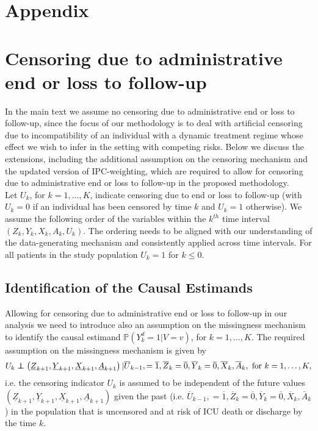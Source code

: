 \documentclass[12pt]{article}
\begin{document}



\newpage

\appendix
\section*{Appendix}

\section{Censoring due to administrative end or loss to follow-up } \label{app0}

In the main text we assume no censoring due to administrative end or loss to follow-up, since the focus of our methodology is to deal with artificial censoring due to incompatibility of an individual with a dynamic treatment regime whose effect we wish to infer in the setting with competing risks. Below we discuss the extensions, including the additional assumption on the censoring mechanism and the updated version of IPC-weighting, which are required to allow for censoring due to administrative end or loss to follow-up in the proposed methodology. 
\\
\indent
Let $U_k$, for $k=1,\dots,K$, indicate censoring due to end or loss to follow-up (with $U_k = 0$ if an individual has been censored by time $k$ and $U_k = 1$ otherwise). We assume the following order of the variables within the $k^{th}$ time interval $\left( Z_k, Y_k, X_k, A_k, U_k \right)$. The ordering needs to be aligned with our understanding of the data-generating mechanism and consistently applied across time intervals.  For all patients in the study population $U_k = 1$ for $k \leq 0$.  

\subsection{Identification of the Causal Estimands}

Allowing for censoring due to administrative end or loss to follow-up in our analysis we need to introduce also an assumption on the missingness mechanism to identify the causal estimand $\mathbb{P} \left( Y_k^d = 1 \vert V = v \right)$, for $k = 1,\dots, K$. The required assumption on the missingness mechanism is given by
\begin{equation} \label{eqnA1}
U_k \perp\!\!\!\!\perp \left( \underline{Z}_{k+1}, \underline{Y}_{k+1}, \underline{X}_{k+1}, \underline{A}_{k+1} \right) \vert \overline{U}_{k-1}, = \overline{1},  \overline{Z}_{k} = \overline{0}, \overline{Y}_{k} = \overline{0}, \overline{X}_{k}, \overline{A}_{k}, \text{ for } k = 1, \dots, K,
\end{equation}
i.e. the censoring indicator $U_k$ is assumed to be independent of the future values \\
$\left( \underline{Z}_{k+1}, \underline{Y}_{k+1}, \underline{X}_{k+1}, \underline{A}_{k+1} \right)$ given the past (i.e. $\overline{U}_{k-1}, = \overline{1},  \overline{Z}_{k} = \overline{0}, \overline{Y}_{k} = \overline{0}, \overline{X}_{k}, \overline{A}_{k}$) in the population that is uncensored and at risk of ICU death or discharge by the time $k$.
\end{document}
